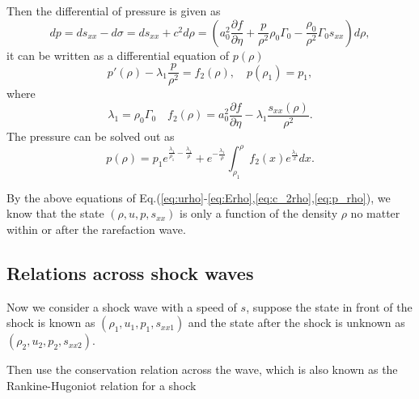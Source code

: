 \documentclass[review]{elsarticle}
\begin{document}
Then the differential of  pressure is  given  as 
\begin{equation}
  dp = ds_{xx} -d\sigma = ds_{xx}+c^2 d\rho = \left( a_0^2 \frac{\partial f}{\partial \eta} + \frac{p}{\rho^2}\rho_0\Gamma_0 -\frac{\rho_0}{\rho^2}\Gamma_0 s_{xx}\right) d\rho,
\end{equation}
it can be written as a differential equation of $p(\rho)$
\begin{equation}
  p'(\rho) - \lambda_1 \frac{p}{\rho^2} = f_2(\rho), \quad p(\rho_1) = p_1,
\end{equation}
where 
\begin{equation}
  \lambda_1 = \rho_0 \Gamma_0 \quad f_2(\rho) = a_0^2\frac{\partial f}{\partial \eta}- \lambda_1\frac{s_{xx}(\rho)}{\rho^2}.
\end{equation}
The pressure can be solved out as
\begin{equation}\label{eq:p_rho}
  p(\rho) = p_1e^{\frac{\lambda_1}{\rho_1}-\frac{\lambda_1}{\rho}} +e^{-\frac{\lambda_1}{\rho}}\int_{\rho_1}^\rho f_2(x) e^{\frac{\lambda_1}{x}}dx.
\end{equation}

By the above equations of Eq.(\ref{eq:urho}-\ref{eq:Erho},\ref{eq:c_2rho},\ref{eq:p_rho}), we know that the state $(\rho, u, p, s_{xx})$ is only  a function of the density $\rho$ no matter within or  after the rarefaction wave.  

\subsection{Relations across  shock waves}\label{sec:shock}
Now we consider a shock wave with a speed of $s$, suppose the state in front of the shock is known as $(\rho_1,u_1,p_1,s_{xx1})$ and the state after the shock is unknown as $(\rho_2,u_2,p_2,s_{xx2})$. 

Then use the conservation relation across the wave, which is also known as the Rankine-Hugoniot relation for a shock 
\end{document}
